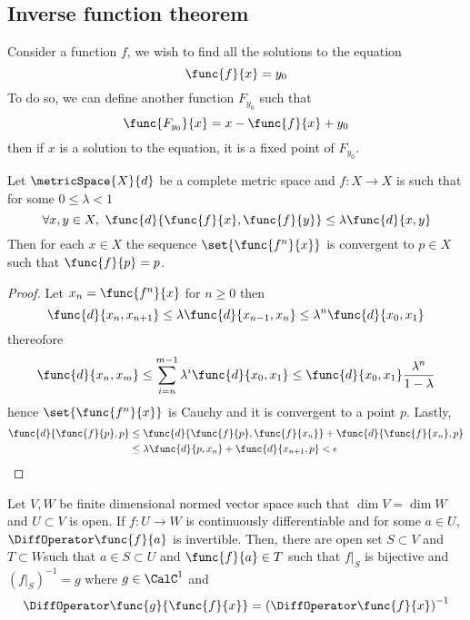 \subsection{Inverse function theorem}
Consider a function \(f\), we wish to find all the solutions to the equation
\begin{equation*}
    \func{f}{x} = y_0
\end{equation*}
To do so, we can define another function \(F_{y_0}\) such that
\begin{equation*}
    \func{F_{y_0}}{x} = x - \func{f}{x} + y_0
\end{equation*}
then if \(x\) is a solution to the equation, it is a fixed point of \(F_{y_0}\).

\begin{theorem}  \label{th:BanachFixedPoint}
    Let \(\metricSpace{X}{d}\) be a complete metric space and \(f : X \to X\) is such that for some \(0 \leq \lambda < 1\)
    \begin{equation*}
        \forall x,y \in X, \ \func{d}{\func{f}{x},\func{f}{y}} \leq \lambda \func{d}{x,y}
    \end{equation*}
    Then for each \(x \in X\) the sequence \(\set{\func{f^n}{x}}\) is convergent to \(p \in X\) such that \(\func{f}{p} = p \).
\end{theorem}

\begin{proof}
    Let \(x_n = \func{f^n}{x}\) for \(n \geq 0\) then
    \begin{equation*}
        \func{d}{x_n,x_{n+1}} \leq \lambda \func{d}{x_{n-1},x_{n}} \leq \lambda^n \func{d}{x_0,x_1}
    \end{equation*}
    thereofore
    \begin{equation*}
        \func{d}{x_n,x_m} \leq \sum_{i = n}^{m-1} \lambda^i \func{d}{x_0,x_1} \leq \func{d}{x_0,x_1} \dfrac{\lambda^n}{1 - \lambda}
    \end{equation*}
    hence \(\set{\func{f^n}{x}}\) is Cauchy and it is convergent to a point \(p\). Lastly,
    \begin{align*}
        \func{d}{\func{f}{p},p} & \leq \func{d}{\func{f}{p},\func{f}{x_n}} + \func{d}{\func{f}{x_n},p} \\
                                & \leq \lambda \func{d}{p,x_n} + \func{d}{x_{n+1},p} < \epsilon
    \end{align*}
\end{proof}

\begin{theorem}
    Let \(V,W\) be finite dimensional normed vector space such that \(\dim V = \dim W\) and \(U \subset V\) is open. If \(f : U \to W\) is continuously differentiable and for some \(a \in U\), \(\DiffOperator \func{f}{a}\) is invertible. Then, there are open set \(S \subset V\) and \(T \subset W\)such that \(a \in S  \subset U\) and \(\func{f}{a} \in T\) such that \(f|_S\) is bijective and \((f|_S)^{-1} = g\) where \(g \in \CalC^1\) and
    \begin{equation*}
        \DiffOperator \func{g}{\func{f}{x}} = \left(\DiffOperator \func{f}{x}\right)^{-1}
    \end{equation*}
\end{theorem}

